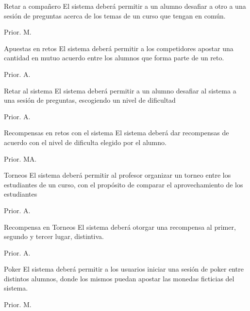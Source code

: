 \begin{RF}{Retar a compañero}{%
    El sistema deberá permitir a un alumno desafiar a otro a una sesión de preguntas acerca de los temas de un curso que tengan en común. }
    \item[] Prior. M. %
\end{RF}

\begin{RF}{Apuestas en retos}{%
    El sistema deberá permitir a los competidores %
    apostar una cantidad en mutuo acuerdo entre los alumnos que forma parte de un reto. }
    \item[] Prior. A. %
\end{RF}

\begin{RF}{Retar al sistema}{%
    El sistema deberá permitir a un alumno desafiar al sistema a una sesión de preguntas, escogiendo un nivel de dificultad }
    \item[] Prior. A. %
\end{RF}

\begin{RF}{Recompensas en retos con el sistema}{%
    El sistema deberá dar recompensas de acuerdo con el nivel de dificulta elegido por el alumno.}
    \item[] Prior. MA. %
\end{RF}

\begin{RF}{Torneos}{%
    El sistema deberá permitir al profesor organizar un torneo entre los estudiantes de un curso, con el propósito de comparar el aprovechamiento de los estudiantes}
    \item[] Prior. A. %
\end{RF}

\begin{RF}{Recompensa en Torneos}{%
    El sistema deberá otorgar una recompensa al primer, segundo y tercer lugar, distintiva. }
    \item[] Prior. A. %
\end{RF}

\begin{RF}{Poker}{%
    El sistema deberá permitir a los usuarios iniciar una sesión de poker entre distintos alumnos, donde los mismos puedan apostar las monedas ficticias del sistema.}
    \item[] Prior. M. %
\end{RF}




